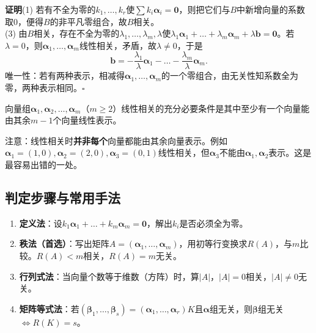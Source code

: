 \textbf{证明}\quad (1) 若有不全为零的$k_1,\dots,k_r$使$\sum k_i\boldsymbol{\alpha}_i=\boldsymbol{0}$，则把它们与$B$中新增向量的系数取$0$，便得$B$的非平凡零组合，故$B$相关。\\
(3) 由$B$相关，存在不全为零的$\lambda_1,\dots,\lambda_m,\lambda$使$\lambda_1\boldsymbol{\alpha}_1+\dots+\lambda_m\boldsymbol{\alpha}_m+\lambda\boldsymbol{b}=\boldsymbol{0}$。若$\lambda=0$，则$\boldsymbol{\alpha}_1,\dots,\boldsymbol{\alpha}_m$线性相关，矛盾，故$\lambda\ne0$，于是
\[
\boldsymbol{b}=-\frac{\lambda_1}{\lambda}\boldsymbol{\alpha}_1-\dots-\frac{\lambda_m}{\lambda}\boldsymbol{\alpha}_m .
\]
唯一性：若有两种表示，相减得$\boldsymbol{\alpha}_1,\dots,\boldsymbol{\alpha}_m$的一个零组合，由无关性知系数全为零，两种表示相同。\hfill$\square$

\begin{theorem}["至少一个可由其余表示"]
向量组$\boldsymbol{\alpha}_1,\boldsymbol{\alpha}_2,\dots,\boldsymbol{\alpha}_m$（$m\ge2$）线性相关的充分必要条件是其中至少有一个向量能由其余$m-1$个向量线性表示。
\end{theorem}

注意：线性相关时\textbf{并非每个}向量都能由其余向量表示。例如$\boldsymbol{\alpha}_1=(1,0),\boldsymbol{\alpha}_2=(2,0),\boldsymbol{\alpha}_3=(0,1)$线性相关，但$\boldsymbol{\alpha}_3$不能由$\boldsymbol{\alpha}_1,\boldsymbol{\alpha}_2$表示。这是最容易出错的一处。

\subsection{判定步骤与常用手法}
\begin{enumerate}
    \item \textbf{定义法}：设$k_1\boldsymbol{\alpha}_1+\dots+k_m\boldsymbol{\alpha}_m=\boldsymbol{0}$，解出$k_i$是否必须全为零。
    \item \textbf{秩法（首选）}：写出矩阵$A=(\boldsymbol{\alpha}_1,\dots,\boldsymbol{\alpha}_m)$，用初等行变换求$R(A)$，与$m$比较。$R(A)<m$相关，$R(A)=m$无关。
    \item \textbf{行列式法}：当向量个数等于维数（方阵）时，算$|A|$，$|A|=0$相关，$|A|\ne0$无关。
    \item \textbf{矩阵等式法}：若$(\boldsymbol{\beta}_1,\dots,\boldsymbol{\beta}_s)=(\boldsymbol{\alpha}_1,\dots,\boldsymbol{\alpha}_r)K$且$\boldsymbol{\alpha}$组无关，则$\boldsymbol{\beta}$组无关$\iff R(K)=s$。
\end{enumerate}


